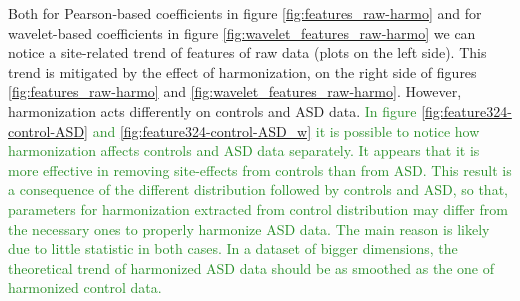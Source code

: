 \documentclass[11pt]{report}
\begin{document}

\hfill

Both for Pearson-based coefficients in figure \ref{fig:features_raw-harmo} and for wavelet-based coefficients in figure \ref{fig:wavelet_features_raw-harmo}  we can notice a site-related trend of features of raw data (plots on the left side).
This trend is mitigated by the effect of harmonization, on the right side of figures  \ref{fig:features_raw-harmo} and \ref{fig:wavelet_features_raw-harmo}.
However, harmonization acts differently on controls and ASD data.
\textcolor{ForestGreen}{
In figure \ref{fig:feature324-control-ASD} and \ref{fig:feature324-control-ASD_w} it is possible to notice how harmonization affects controls and ASD data separately.
It appears that it is more effective in removing site-effects from controls than from ASD.
This result is a consequence of the different distribution followed by controls and ASD, so that, parameters for harmonization extracted from control distribution may differ from the necessary ones to properly harmonize ASD data. The main reason is likely due to little statistic in both cases.
In a dataset of bigger dimensions, the theoretical trend of harmonized ASD data should be as smoothed as the one of harmonized control data.
}
\end{document}
